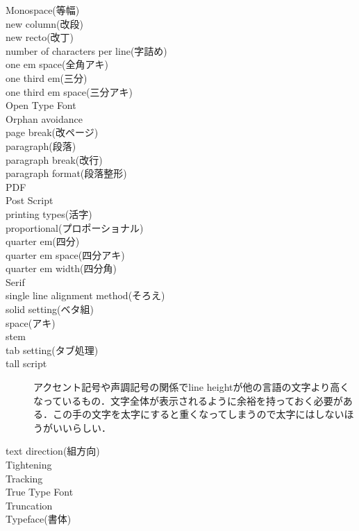 \begin{description}
    \item[Monospace(等幅)]
    \item[new column(改段)]
    \item[new recto(改丁)]
    \item[number of characters per line(字詰め)]
    \item[one em space(全角アキ)]
    \item[one third em(三分)]
    \item[one third em space(三分アキ)]
    \item[Open Type Font]
    \item[Orphan avoidance]
    \item[page break(改ページ)]
    \item[paragraph(段落)]
    \item[paragraph break(改行)]
    \item[paragraph format(段落整形)]
    \item[PDF]
    \item[Post Script]
    \item[printing types(活字)]
    \item[proportional(プロポーショナル)]
    \item[quarter em(四分)]
    \item[quarter em space(四分アキ)]
    \item[quarter em width(四分角)]
    \item[Serif]
    \item[single line alignment method(そろえ)]
    \item[solid setting(ベタ組)]
    \item[space(アキ)]
    \item[stem]
    \item[tab setting(タブ処理)]
    \item[tall script]アクセント記号や声調記号の関係でline heightが他の言語の文字より高くなっているもの．文字全体が表示されるように余裕を持っておく必要がある\cite{developer.apple.com:videos/play/wwdc2016/201/}．この手の文字を太字にすると重くなってしまうので太字にはしないほうがいいらしい\cite{material.io:design/typography/language-support.html}．
    \item[text direction(組方向)]
    \item[Tightening]
    \item[Tracking]
    \item[True Type Font]
    \item[Truncation]
    \item[Typeface(書体)]

\end{description}
